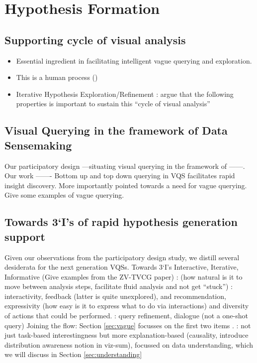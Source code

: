 \section{Hypothesis Formation\label{sec:hypothesis}}
\subsection{Supporting cycle of visual analysis}
\begin{itemize}
	\item Essential ingredient in facilitating intelligent vague querying and exploration.
	\item This is a human process (\cite{Heer2012,Pirolli})
	\item Iterative Hypothesis Exploration/Refinement : argue that the following properties is important to sustain this “cycle of visual analysis” 
\end{itemize}
\subsection{Visual Querying in the framework of Data Sensemaking}
\cite{Lee2017}
Our participatory design ---situating visual querying in the framework of ------. Our \zv work ------- Bottom up and top down querying in VQS facilitates rapid insight discovery. More importantly pointed towards a need for vague querying. Give some examples of vague querying.

\subsection{Towards 3‘I’s of rapid hypothesis generation support}
Given our observations from the participatory design study, we distill several desiderata for the next generation VQSs. 
Towards 3‘I’s Interactive, Iterative, Informative (Give examples from the ZV-TVCG paper)
:
 (how natural is it to move between analysis steps, facilitate fluid analysis and not get “stuck”) : interactivity, feedback (latter is quite unexplored), and recommendation, expressivity (how easy is it to express what to do via interactions) and diversity of actions that could be performed.
: query refinement, dialogue (not a one-shot query)
Joining the flow: Section \ref{sec:vague} focusses on the first two items .
: not just task-based interestingness but more explanation-based (causality, introduce distribution awareness notion in viz-sum), focussed on data understanding, which we will discuss in Section \ref{sec:understanding}